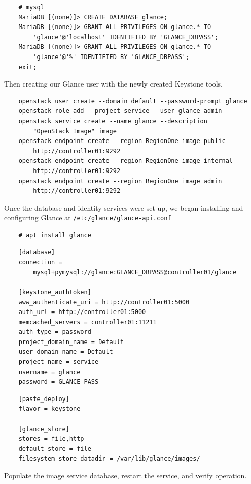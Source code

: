 \documentclass{article}
\begin{document}
\begin{verbatim}
    # mysql
    MariaDB [(none)]> CREATE DATABASE glance;
    MariaDB [(none)]> GRANT ALL PRIVILEGES ON glance.* TO
        'glance'@'localhost' IDENTIFIED BY 'GLANCE_DBPASS';
    MariaDB [(none)]> GRANT ALL PRIVILEGES ON glance.* TO 
        'glance'@'%' IDENTIFIED BY 'GLANCE_DBPASS';
    exit;
\end{verbatim}

Then creating our Glance user with the newly created Keystone tools.

\begin{verbatim}
    openstack user create --domain default --password-prompt glance
    openstack role add --project service --user glance admin
    openstack service create --name glance --description 
        "OpenStack Image" image
    openstack endpoint create --region RegionOne image public 
        http://controller01:9292
    openstack endpoint create --region RegionOne image internal 
        http://controller01:9292
    openstack endpoint create --region RegionOne image admin 
        http://controller01:9292
\end{verbatim}

Once the database and identity services were set up, we began installing and configuring Glance at \texttt{/etc/glance/glance-api.conf}

\begin{verbatim}
    # apt install glance
\end{verbatim}

\begin{verbatim}
    [database]
    connection = 
        mysql+pymysql://glance:GLANCE_DBPASS@controller01/glance

    [keystone_authtoken]
    www_authenticate_uri = http://controller01:5000
    auth_url = http://controller01:5000
    memcached_servers = controller01:11211
    auth_type = password
    project_domain_name = Default
    user_domain_name = Default
    project_name = service
    username = glance
    password = GLANCE_PASS
\end{verbatim}
\begin{verbatim}
    [paste_deploy]
    flavor = keystone

    [glance_store]
    stores = file,http
    default_store = file
    filesystem_store_datadir = /var/lib/glance/images/
\end{verbatim}

Populate the image service database, restart the service, and verify operation.
\end{document}
